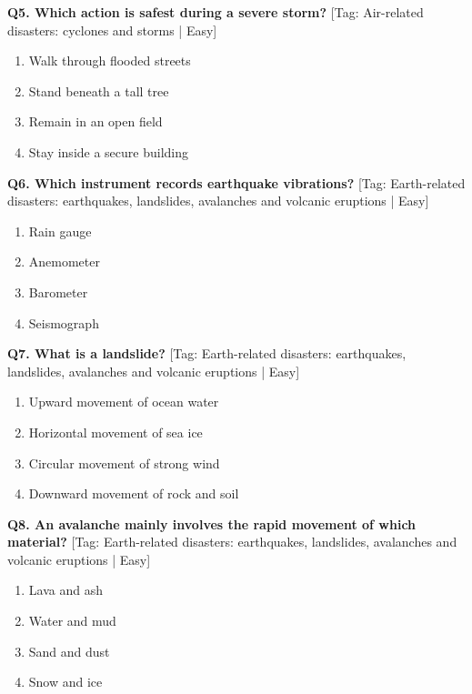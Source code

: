 \noindent\textbf{Q5. Which action is safest during a severe storm?} \hfill [Tag: Air-related disasters: cyclones and storms | Easy]
\begin{enumerate}[label=(\alph*),topsep=2pt,itemsep=1pt,partopsep=0pt,parsep=0pt]
    \item {Walk through flooded streets}
    \item {Stand beneath a tall tree}
    \item {Remain in an open field}
    \item {Stay inside a secure building}
\end{enumerate}
\vspace{2mm}

\noindent\textbf{Q6. Which instrument records earthquake vibrations?} \hfill [Tag: Earth-related disasters: earthquakes, landslides, avalanches and volcanic eruptions | Easy]
\begin{enumerate}[label=(\alph*),topsep=2pt,itemsep=1pt,partopsep=0pt,parsep=0pt]
    \item {Rain gauge}
    \item {Anemometer}
    \item {Barometer}
    \item {Seismograph}
\end{enumerate}
\vspace{2mm}

\noindent\textbf{Q7. What is a landslide?} \hfill [Tag: Earth-related disasters: earthquakes, landslides, avalanches and volcanic eruptions | Easy]
\begin{enumerate}[label=(\alph*),topsep=2pt,itemsep=1pt,partopsep=0pt,parsep=0pt]
    \item {Upward movement of ocean water}
    \item {Horizontal movement of sea ice}
    \item {Circular movement of strong wind}
    \item {Downward movement of rock and soil}
\end{enumerate}
\vspace{2mm}

\noindent\textbf{Q8. An avalanche mainly involves the rapid movement of which material?} \hfill [Tag: Earth-related disasters: earthquakes, landslides, avalanches and volcanic eruptions | Easy]
\begin{enumerate}[label=(\alph*),topsep=2pt,itemsep=1pt,partopsep=0pt,parsep=0pt]
    \item {Lava and ash}
    \item {Water and mud}
    \item {Sand and dust}
    \item {Snow and ice}
\end{enumerate}
\vspace{2mm}

